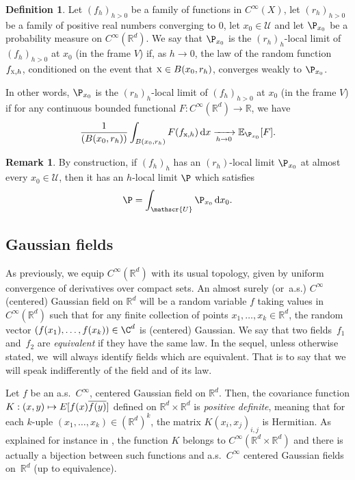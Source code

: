 \documentclass[JEP,XML,SOM,Unicode,published]{cedram}
\let\mathcal\mathscr
\newcommand{\NoChangel}[1]{%
\expandafter\let\csname old\string#1\endcsname=#1
\let#1=\relax
\newcommand{#1}{\mathcode`l="716C\csname old\string#1\endcsname\mathcode`l="7160 }%
}
\newcommand\mto{\mathchoice{\longmapsto}{\mapsto}{\mapsto}{\mapsto}}
\newcommand{\rd}{\,\mathrm{d}}
\theoremstyle{plain}
\theoremstyle{definition}
\newtheorem{definition}[theorem]{Definition}
\newtheorem{remark}[theorem]{Remark}
\newcommand{\R}{\mathbb{R}}
\def\calU{\mathcal{U}}
\DeclareMathOperator{\Vol}{Vol}\NoChangel{\Vol}
\begin{document}
\begin{definition}
Let $(f_h)_{h>0}$ be a family of functions in $C^\infty(X)$, let $(r_h)_{h>0}$ be a family of positive real numbers converging to $0$, let $x_0\in\calU$ and let $\P_{x_0}$ be a probability measure on $C^\infty(\R^d)$. We say that $\P_{x_0}$ is the $(r_h)_h$-local limit of $(f_h)_{h>0}$ at $x_0$ (in the frame $V$) if, as $h\to 0$, the law of the random function $f_{\textsc{x},h}$, conditioned on the event that $\textsc{x}\in B(x_0,r_h)$, converges weakly to $\P_{x_0}$.
\end{definition}

In other words, $\P_{x_0}$ is the $(r_h)_h$-local limit of $(f_h)_{h>0}$ at $x_0$ (in the frame $V$) if for any continuous bounded functional $F: C^\infty(\R^d) \to \R$, we have
\[
\frac{1}{\Vol(B(x_0, r_h))} \int_{B(x_0,r_h)} F (f_{\mathrm{x},h})\rd x \xrightarrow[h \to 0]{} \mathbb{E}_{\P_{x_0}} [F].
\]

\begin{remark}\label{rem:PointwiseToGlobal}
By construction, if $(f_h)_h$ has an $(r_h)$-local limit $\P_{x_0}$ at almost every $x_0\in\calU$, then it has an $h$-local limit $\P$ which satisfies
\[
\P = \int_{\calU} \P_{x_0} \rd x_0.
\]
\end{remark}

\subsection{Gaussian fields}\label{subsec:GaussField}

As previously, we equip $C^\infty(\R^d)$ with its usual topology, given by uniform convergence of derivatives over compact sets. An almost surely (or~a.s.) $C^\infty$ (centered) Gaussian field on $\R^d$ will be a random variable $f$ taking values in $C^\infty(\R^d)$ such that for any finite collection of points $x_1,\dots,x_k\in \R^d$, the random vector $(f(x_1),\dots,f(x_k))\in \C^d$ is (centered) Gaussian. We say that two fields~$f_1$ and~$f_2$ are \emph{equivalent} if they have the same law. In the sequel, unless otherwise stated, we~will always identify fields which are equivalent. That is to say that we will speak indifferently of the field and of its law.

Let $f$ be an a.s.\ $C^\infty$, centered Gaussian field on $\R^d$. Then, the covariance function $K:(x,y)\mto E[f(x)\overline{f(y)}]$ defined on $\R^d\times \R^d$ is \emph{positive definite}, meaning that for each $k$-uple $(x_1,\dots,x_k)\in (\R^d)^k$, the matrix $K(x_i,x_j)_{i,j}$ is Hermitian. As explained for instance in \cite[App.\,A.11]{NS}, the function $K$ belongs to $C^\infty(\R^d\times \R^d)$ and there is actually a bijection between such functions and a.s.\ $C^\infty$ centered Gaussian fields on~$\R^d$ (up to equivalence).
\end{document}
